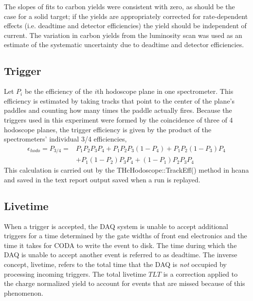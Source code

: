 The slopes of fits to carbon yields were consistent with zero, as should be the
case for a solid target;
if the yields are appropriately corrected for rate-dependent effects (i.e.
deadtime and detector efficiencies) the yield should be independent of current.
The variation in carbon yields from the luminosity scan was used as an estimate
of the systematic uncertainty due to deadtime and detector efficiencies.

\subsection{Trigger}
Let $P_i$ be the efficiency of the $i$th hodoscope plane in one spectrometer.
This efficiency is estimated by taking tracks that point to the center of
the plane's paddles and counting how many times the paddle actually fires.
Because the triggers used in this experiment were formed by the coincidence of
three of 4 hodoscope planes, the trigger efficiency is given by the product of
the spectrometers' individual 3/4 efficiencies,
\begin{align}
    \epsilon_{hodo} = P_{3/4} =& P_{1} P_{2} P_{3} P_{4}+P_{1} P_{2} P_{3}\left(1-P_{4}\right)+P_{1} P_{2}\left(1-P_{3}\right) P_{4} \\
              &+P_{1}\left(1-P_{2}\right) P_{3} P_{4}+\left(1-P_{1}\right) P_{2} P_{3} P_{4}
\end{align}
This calculation is carried out by the THcHodoscope::TrackEff() method in
hcana and saved in the text report output saved when a run is
replayed.

\subsection{Livetime} \label{sec:livetime}
When a trigger is accepted, the DAQ system is unable to accept additional
triggers for a time determined by the gate widths of front end electronics and
the time it takes for CODA to write the event to disk.
The time during which the DAQ is unable to accept another event is referred to
as deadtime.
The inverse concept, livetime, refers to the total time that the DAQ is
\textit{not} occupied by processing incoming triggers.
The total livetime $TLT$ is a correction applied to the charge normalized yield
to account for events that are missed because of this phenomenon.

